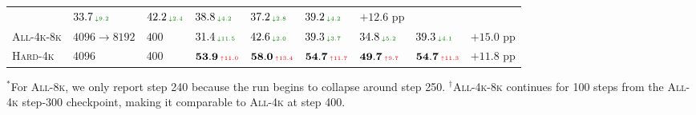\documentclass{article} %
\begin{document}
\begin{table}[ht]
{\begin{tabular}{lllllllll}
      & $33.7\,{\scriptscriptstyle\textcolor{green!50!black}{\downarrow 9.2}}$
      & $42.2\,{\scriptscriptstyle\textcolor{green!50!black}{\downarrow 2.4}}$
      & $38.8\,{\scriptscriptstyle\textcolor{green!50!black}{\downarrow 4.2}}$
      & $37.2\,{\scriptscriptstyle\textcolor{green!50!black}{\downarrow 2.8}}$
      & $39.2\,{\scriptscriptstyle\textcolor{green!50!black}{\downarrow 4.2}}$
      & ${+12.6}$ pp \\
    \textsc{All-4k-8k} & $4096\!\rightarrow\!8192$ & $400$
      & $31.4\,{\scriptscriptstyle\textcolor{green!50!black}{\downarrow 11.5}}$
      & $42.6\,{\scriptscriptstyle\textcolor{green!50!black}{\downarrow 2.0}}$
      & $39.3\,{\scriptscriptstyle\textcolor{green!50!black}{\downarrow 3.7}}$
      & $34.8\,{\scriptscriptstyle\textcolor{green!50!black}{\downarrow 5.2}}$
      & $39.3\,{\scriptscriptstyle\textcolor{green!50!black}{\downarrow 4.1}}$
      & $\mathbf{+15.0}$ pp \\
    \textsc{Hard-4k} & 4096 & 400
      & $\mathbf{53.9}\,{\scriptscriptstyle\textcolor{red}{\uparrow 11.0}}$
      & $\mathbf{58.0}\,{\scriptscriptstyle\textcolor{red}{\uparrow 13.4}}$
      & $\mathbf{54.7}\,{\scriptscriptstyle\textcolor{red}{\uparrow 11.7}}$
      & $\mathbf{49.7}\,{\scriptscriptstyle\textcolor{red}{\uparrow 9.7}}$
      & $\mathbf{54.7}\,{\scriptscriptstyle\textcolor{red}{\uparrow 11.3}}$
      & $+11.8$ pp \\
    \bottomrule
  \end{tabular}
  }

  \vspace{0.3em}
  \begin{minipage}{0.98\textwidth}
    \footnotesize
    $^{\ast}$For \textsc{All-8k}, we only report step 240 because the run begins to
    collapse around step 250.
    $^{\dagger}$\textsc{All-4k-8k} continues for 100 steps from the
\textsc{All-4k} step-300 checkpoint, making it comparable to
\textsc{All-4k} at step 400.
  \end{minipage}
\end{table}
\end{document}
